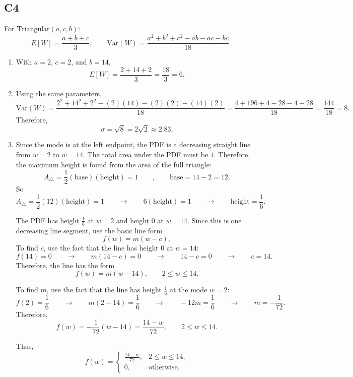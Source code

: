 \subsection*{C4}
For \(\text{Triangular}(a,c,b)\):
\[
E[W]=\frac{a+b+c}{3},\qquad
\mathrm{Var}(W)=\frac{a^2+b^2+c^2-ab-ac-bc}{18}.
\]

\begin{enumerate}[label=\textbf{\alph*)}]
	\item With \(a=2\), \(c=2\), and \(b=14\),
	\[
	E[W]=\frac{2+14+2}{3}=\frac{18}{3}=6.
	\]
	
	\item Using the same parameters,
	\[
	\mathrm{Var}(W)=\frac{2^2+14^2+2^2-(2)(14)-(2)(2)-(14)(2)}{18}
	=
	\frac{4+196+4-28-4-28}{18}
	=
	\frac{144}{18}=8.
	\]
	Therefore,
	\[
	\sigma=\sqrt{8}=2\sqrt{2}\approx 2.83.
	\]
	
		\item Since the mode is at the left endpoint, the PDF is a decreasing straight line from \(w=2\) to \(w=14\). The total area under the PDF must be \(1\). Therefore, the maximum height is found from the area of the full triangle:
	\[
	A_{\triangle} = \frac{1}{2}(\text{base})(\text{height})=1
	\qquad , \qquad
	\text{base}=14-2=12.
	\]
	So
	\[
	A_{\triangle}=\frac{1}{2}(12)(\text{height})=1
	\qquad \longrightarrow \qquad
	6(\text{height})=1
	\qquad \longrightarrow \qquad
	\text{height}=\frac{1}{6}.
	\]
	
	The PDF has height \(\frac{1}{6}\) at \(w=2\) and height \(0\) at \(w=14\). Since this is one decreasing line segment, use the basic line form
	\[
	f(w)=m(w-c),
	\]
	To find \(c\), use the fact that the line has height \(0\) at \(w=14\):
	\[
	f(14)=0
	\qquad \longrightarrow \qquad
	m(14-c)=0
	\qquad \longrightarrow \qquad
	14-c=0
	\qquad \longrightarrow \qquad
	c=14.
	\]
	Therefore, the line has the form
	\[
	f(w)=m(w-14),
	\qquad 2\le w\le 14.
	\]
	
	To find \(m\), use the fact that the line has height \(\frac{1}{6}\) at the mode \(w=2\):
	\[
	f(2)=\frac{1}{6}
	\qquad \longrightarrow \qquad
	m(2-14)=\frac{1}{6}
	\qquad \longrightarrow \qquad
	-12m=\frac{1}{6}
	\qquad \longrightarrow \qquad
	m=-\frac{1}{72}.
	\]
	Therefore,
	\[
	f(w)=-\frac{1}{72}(w-14)
	=
	\frac{14-w}{72},
	\qquad 2\le w\le 14.
	\]
	
	Thus,
	\[
	f(w)=
	\begin{cases}
		\frac{14-w}{72}, & 2\le w\le 14,\\
		0, & \text{otherwise}.
	\end{cases}
	\]
	

\end{enumerate}
